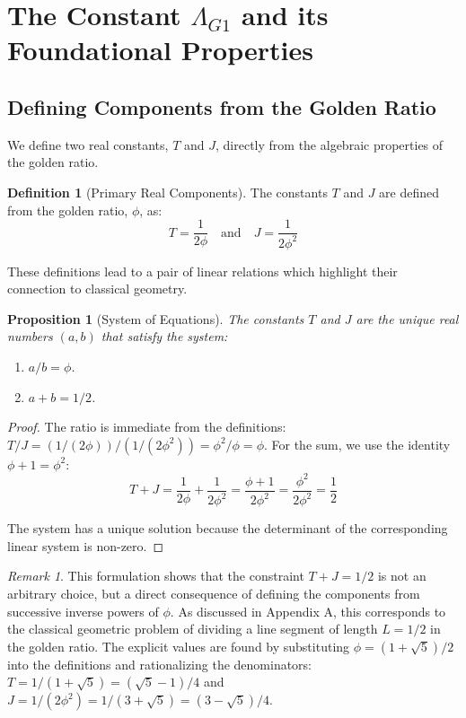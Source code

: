 \documentclass{amsart}
\theoremstyle{plain}
\newtheorem{proposition}[theorem]{Proposition}
\theoremstyle{definition}
\newtheorem{definition}[theorem]{Definition}
\theoremstyle{remark}
\newtheorem*{remark}{Remark}
\begin{document}
\section{The Constant \texorpdfstring{$\Lambda_{G1}$}{Lambda\_G1} and its Foundational Properties}

\subsection{Defining Components from the Golden Ratio}
We define two real constants, $T$ and $J$, directly from the algebraic properties of the golden ratio.

\begin{definition}[Primary Real Components]
The constants $T$ and $J$ are defined from the golden ratio, $\phi$, as:
$$ T = \frac{1}{2\phi} \quad \text{and} \quad J = \frac{1}{2\phi^2} $$

\end{definition}

These definitions lead to a pair of linear relations which highlight their connection to classical geometry.

\begin{proposition}[System of Equations]
The constants $T$ and $J$ are the unique real numbers $(a,b)$ that satisfy the system:
\begin{enumerate}
    \item $a/b = \phi$.
    \item $a+b = 1/2$.
\end{enumerate}

\end{proposition}
\begin{proof}
The ratio is immediate from the definitions: $T/J = (1/(2\phi))/(1/(2\phi^2)) = \phi^2/\phi = \phi$. For the sum, we use the identity $\phi+1 = \phi^2$:
$$ T+J = \frac{1}{2\phi} + \frac{1}{2\phi^2} = \frac{\phi+1}{2\phi^2} = \frac{\phi^2}{2\phi^2} = \frac{1}{2} $$

The system has a unique solution because the determinant of the corresponding linear system is non-zero.
\end{proof}

\begin{remark}
This formulation shows that the constraint $T+J=1/2$ is not an arbitrary choice, but a direct consequence of defining the components from successive inverse powers of $\phi$. As discussed in Appendix A, this corresponds to the classical geometric problem of dividing a line segment of length $L=1/2$ in the golden ratio. The explicit values are found by substituting $\phi = (1+\sqrt{5})/2$ into the definitions and rationalizing the denominators: $T = 1/(1+\sqrt{5}) = (\sqrt{5}-1)/4$ and $J = 1/(2\phi^2) = 1/(3+\sqrt{5}) = (3-\sqrt{5})/4$.
\end{remark}
\end{document}
